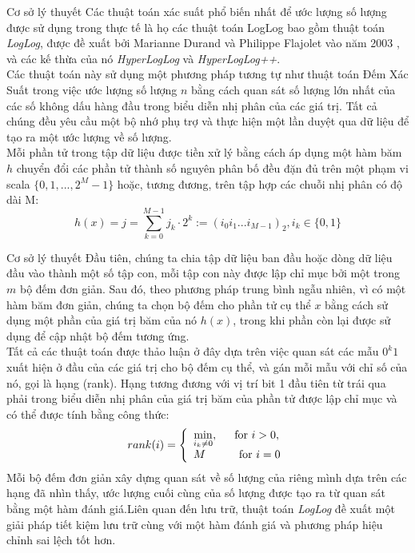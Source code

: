 \documentclass[10pt]{beamer}
\begin{document}
\begin{frame}[fragile]{Cơ sở lý thuyết}
Các thuật toán xác suất phổ biến nhất để ước lượng số lượng được sử dụng trong 
thực tế là họ các thuật toán LogLog bao gồm thuật toán \textit{LogLog}, 
được đề xuất bởi Marianne Durand và Philippe Flajolet vào năm 2003 \cite{durand2003loglog}, 
và các kế thừa của nó \textit{HyperLogLog} và \textit{HyperLogLog++}.\\
Các thuật toán này sử dụng một phương pháp tương tự như thuật toán Đếm Xác Suất trong việc ước lượng số lượng $n$ bằng cách quan sát số lượng lớn nhất 
của các số không dấu hàng đầu trong biểu diễn nhị phân của các giá trị. Tất cả chúng đều yêu cầu một bộ nhớ phụ trợ và thực hiện một lần duyệt qua dữ liệu 
để tạo ra một ước lượng về số lượng.\\

Mỗi phần tử trong tập dữ liệu được tiền xử lý bằng cách áp dụng một hàm băm $h$ chuyển đổi các phần tử thành số nguyên phân bố đều đặn đủ 
trên một phạm vi scala $\{0,1,...,2^M-1\}$ hoặc, tương đương, trên tập hợp các chuỗi nhị phân có độ dài M:
\[
    h(x) = j = \sum\limits_{k=0}^{M-1}j_k\cdot2^k := \left(i_0i_1...i_{M-1}\right)_2,i_k \in \{0,1\}
\]
\end{frame}
\begin{frame}[fragile]{Cơ sở lý thuyết}
Đầu tiên, chúng ta chia tập dữ liệu ban đầu hoặc dòng dữ liệu đầu vào thành một số 
tập con, mỗi tập con này được lập chỉ mục bởi một trong $m$ bộ đếm đơn giản. 
Sau đó, theo phương pháp trung bình ngẫu nhiên, vì có một hàm băm đơn giản, chúng ta 
chọn bộ đếm cho phần tử cụ thể $x$ bằng cách sử dụng một phần của giá trị băm 
của nó $h(x)$, trong khi phần còn lại được sử dụng để cập nhật bộ đếm tương ứng.\\
Tất cả các thuật toán được thảo luận ở đây dựa trên việc quan sát các mẫu $0^k1$ 
xuất hiện ở đầu của các giá trị cho bộ đếm cụ thể, và gán mỗi mẫu với chỉ số của nó, 
gọi là hạng (rank). Hạng tương đương với vị trí bit 1 đầu tiên từ trái qua phải 
trong biểu diễn nhị phân của giá trị băm của phần tử được lập chỉ mục và có thể được 
tính bằng công thức:
\[
    rank(i)=\left\{
                \begin{array}{ll}
                    \min\limits_{i_k\neq 0}, \indent\text{for } i > 0,\\
                    M\indent\indent\text{for } i = 0
                \end{array}
            \right.
\]
Mỗi bộ đếm đơn giản xây dựng quan sát về số lượng của riêng mình dựa trên các hạng 
đã nhìn thấy, ước lượng cuối cùng của số lượng được tạo ra từ quan sát bằng một 
hàm đánh giá.Liên quan đến lưu trữ, thuật toán \textit{LogLog} đề xuất một 
giải pháp tiết kiệm lưu trữ cùng với một hàm đánh giá và phương pháp hiệu chỉnh 
sai lệch tốt hơn.
\end{frame}
\end{document}
